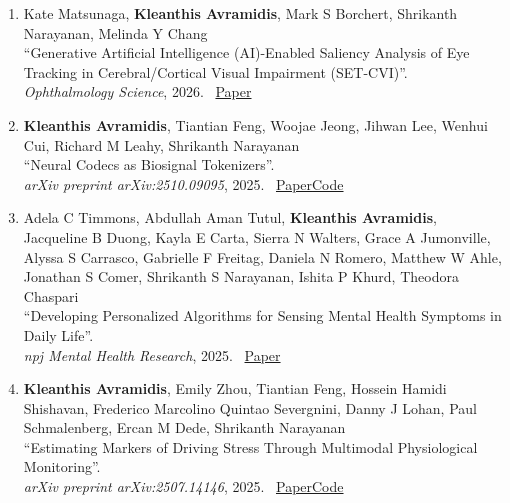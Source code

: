 \documentclass[margin]{res}
\begin{document}
\begin{resume}
\begin{enumerate}[leftmargin=*,itemsep=3pt]
\newpage
\item \begin{minipage}[t]{\linewidth}\raggedright
    Kate Matsunaga, \textbf{Kleanthis Avramidis}, Mark S Borchert, Shrikanth Narayanan, Melinda Y Chang \\
    ``Generative Artificial Intelligence (AI)-Enabled Saliency Analysis of Eye Tracking in Cerebral/Cortical Visual Impairment (SET-CVI)''. \\
    \textit{Ophthalmology Science}, 2026. \ \href{https://www.sciencedirect.com/science/article/pii/S2666914526000199}{Paper}
\end{minipage}

\item \begin{minipage}[t]{\linewidth}\raggedright
    \textbf{Kleanthis Avramidis}, Tiantian Feng, Woojae Jeong, Jihwan Lee, Wenhui Cui, Richard M Leahy, Shrikanth Narayanan \\
    ``Neural Codecs as Biosignal Tokenizers''. \\
    \textit{arXiv preprint arXiv:2510.09095}, 2025. \ \href{https://arxiv.org/abs/2510.09095}{Paper}\enspace \href{https://github.com/klean2050/BioCodec-release}{Code}
\end{minipage}

\item \begin{minipage}[t]{\linewidth}\raggedright
    Adela C Timmons, Abdullah Aman Tutul, \textbf{Kleanthis Avramidis}, Jacqueline B Duong, Kayla E Carta, Sierra N Walters, Grace A Jumonville, Alyssa S Carrasco, Gabrielle F Freitag, Daniela N Romero, Matthew W Ahle, Jonathan S Comer, Shrikanth S Narayanan, Ishita P Khurd, Theodora Chaspari \\
    ``Developing Personalized Algorithms for Sensing Mental Health Symptoms in Daily Life''. \\
    \textit{npj Mental Health Research}, 2025. \ \href{https://www.nature.com/articles/s44184-025-00147-5}{Paper}
\end{minipage}

\item \begin{minipage}[t]{\linewidth}\raggedright
    \textbf{Kleanthis Avramidis}, Emily Zhou, Tiantian Feng, Hossein Hamidi Shishavan, Frederico Marcolino Quintao Severgnini, Danny J Lohan, Paul Schmalenberg, Ercan M Dede, Shrikanth Narayanan \\
    ``Estimating Markers of Driving Stress Through Multimodal Physiological Monitoring''. \\
    \textit{arXiv preprint arXiv:2507.14146}, 2025. \ \href{https://arxiv.org/abs/2507.14146}{Paper}\enspace \href{https://github.com/usc-sail/driving-stressors}{Code}
\end{minipage}


\end{enumerate}
\end{resume}
\end{document}
